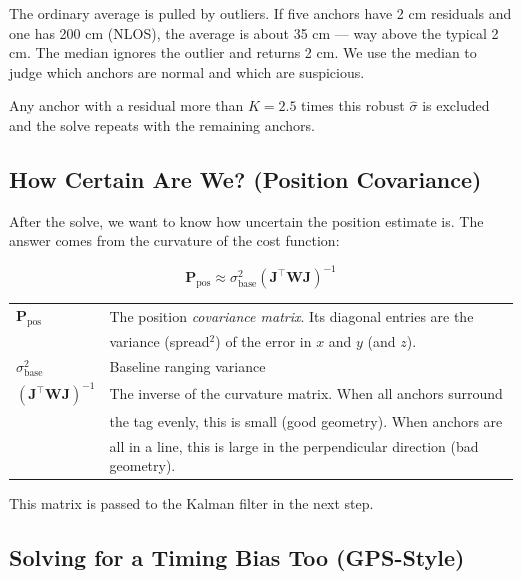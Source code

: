 \documentclass[11pt,a4paper]{article}
\newcommand{\mat}[1]{\mathbf{#1}}
\begin{document}
\begin{plain}
The ordinary average is pulled by outliers. If five anchors have 2 cm residuals and one has 200 cm (NLOS), the average is about 35 cm --- way above the typical 2 cm. The median ignores the outlier and returns 2 cm. We use the median to judge which anchors are normal and which are suspicious.

Any anchor with a residual more than $K = 2.5$ times this robust $\hat{\sigma}$ is excluded and the solve repeats with the remaining anchors.
\end{plain}

\subsection{How Certain Are We? (Position Covariance)}

After the solve, we want to know how uncertain the position estimate is. The answer comes from the curvature of the cost function:

\begin{equation}
\mat{P}_{\text{pos}} \approx \sigma_{\text{base}}^2 \left(\mat{J}^\top \mat{W} \mat{J}\right)^{-1}
\label{eq:cov}
\end{equation}

\begin{symbols}
\begin{tabular}{ll}
$\mat{P}_{\text{pos}}$ & The position \emph{covariance matrix}. Its diagonal entries are the \\
     & variance (spread$^2$) of the error in $x$ and $y$ (and $z$). \\
$\sigma_{\text{base}}^2$ & Baseline ranging variance \\
$(\mat{J}^\top\mat{W}\mat{J})^{-1}$ & The inverse of the curvature matrix. When all anchors surround \\
     & the tag evenly, this is small (good geometry). When anchors are \\
     & all in a line, this is large in the perpendicular direction (bad geometry). \\
\end{tabular}
\end{symbols}

This matrix is passed to the Kalman filter in the next step.

\subsection{Solving for a Timing Bias Too (GPS-Style)}
\end{document}
